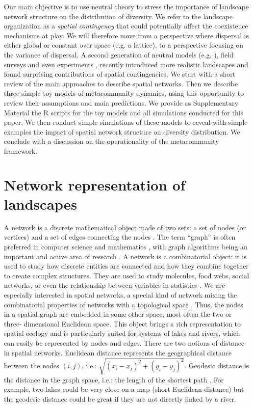 \documentclass[12pt]{article}
\begin{document}
Our main objective is to use neutral theory to stress the importance of
landscape network structure on the distribution of diversity. We refer to the
landscape organization as a \emph{spatial contingency}
\parencite{Peres-Neto2012} that could potentially affect the coexistence
mechanisms at play. We will therefore move from a perspective where dispersal is
either global or constant over space (e.g. a lattice), to a perspective focusing
on the variance of dispersal. A second generation of neutral models (e.g.
\textcite{Economo2008, Economo2011,Desjardins2012a,Desjardins2012b}), field
surveys \parencite{Muneepeerakul2008} and even experiments
\parencite{Carrara2012}, recently introduced more realistic landscapes and found
surprising contributions of spatial contingencies. We start with a short review
of the main approaches to describe spatial networks. Then we describe three
simple toy models of metacommunity dynamics, using this opportunity to review
their assumptions and main predictions. We provide as Supplementary Material the
R scripts for the toy models and all simulations conducted for this paper. We
then conduct simple simulations of these models to reveal with simple examples
the impact of spatial network structure on diversity distribution. We conclude
with a discussion on the operationality of the metacommunity framework.

\section*{Network representation of landscapes}

A network is a discrete mathematical object made of two sets: a set of nodes
(or vertices) and a set of edges connecting the nodes \parencite{new10}. The
term ``graph'' is often preferred in computer science and mathematics
\parencite{gro06}, with graph algorithms being an important and active area of
research \parencite{sed01}. A network is a combinatorial object: it is used to study
how discrete entities are connected and how they combine together to create
complex structures. They are used to study molecules, food webs, social
networks, or even the relationship between variables in statistics
\parencite{wri21,new10}. We are especially interested in spatial networks, a special
kind of network mixing the combinatorial properties of networks with a
topological space \parencite{kob94}. Thus, the nodes in a spatial graph are
embedded in some other space, most often the two or three- dimensional Euclidean
space. This object brings a rich representation to spatial ecology and is
particularly suited for systems of lakes and rivers, which can easily be
represented by nodes and edges. There are two notions of distance in spatial
networks. Euclidean distance represents the geographical distance between the
nodes $(i, j)$, i.e.: $\sqrt{(x_i - x_j)^2 + (y_i - y_ j)^2}$. Geodesic
distance is the distance in the graph space, i.e.: the length of the shortest
path \parencite{dij59}. For example, two lakes could be very close on a map (short
Euclidean distance) but the geodesic distance could be great if they are not
directly linked by a river.
\end{document}
